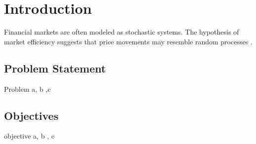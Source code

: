 \section{Introduction}

Financial markets are often modeled as stochastic systems. The hypothesis of market efficiency suggests that price movements may resemble random processes \cite{fama1970}.

\subsection{Problem Statement}

Problem a, b ,c 

\subsection{Objectives}

objective a, b , c